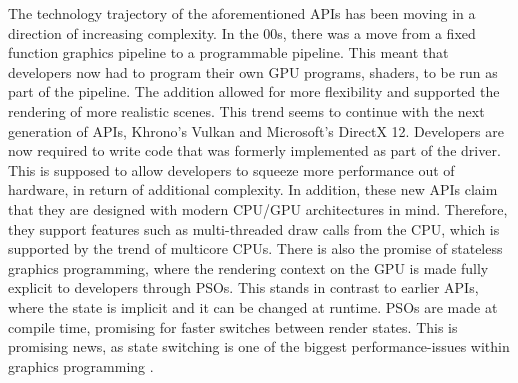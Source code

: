 The technology trajectory of the aforementioned \glspl{API} has been moving in a direction of increasing complexity.
In the 00s, there was a move from a fixed function graphics pipeline to a programmable pipeline.
This meant that developers now had to program their own GPU programs, shaders, to be run as part of the pipeline. 
The addition allowed for more flexibility and supported the rendering of more realistic scenes.
This trend seems to continue with the next generation of \glspl{API}, Khrono’s Vulkan and Microsoft’s DirectX 12. 
Developers are now required to write code that was formerly implemented as part of the driver. 
This is supposed to allow developers to squeeze more performance out of hardware,  in return of additional complexity. 
In addition, these new \glspl{API} claim that they are designed with modern \gls{CPU}/\gls{GPU} architectures in mind.  
Therefore, they support features such as multi-threaded draw calls from the \gls{CPU}, which is supported by the trend of multicore \glspl{CPU}. 
There is also the promise of stateless graphics programming, where the rendering context on the \gls{GPU} is made fully explicit to developers through \glspl{PSO}. 
This stands in contrast to earlier \glspl{API}, where the state is implicit and it can be changed at runtime. 
\glspl{PSO} are made at compile time, promising for faster switches between render states.
This is promising news, as state switching is one of the biggest performance-issues within graphics programming \cite{worister2013lazy}.
